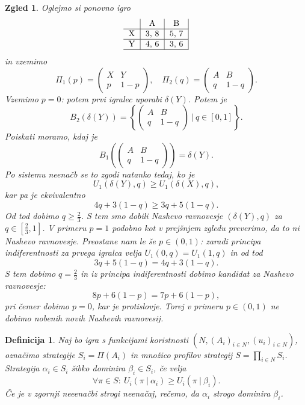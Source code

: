 \documentclass[10pt, a4paper]{article}
\newtheorem{defi}[izr]{Definicija}
\newenvironment{noticeB}{%
  \tcolorbox[%
  notitle,
  empty,
  enhanced,  %
  breakable,
  coltext=black,
  colback=white, 
  fontupper=\rmfamily,
  noparskip,
  sharp corners,
  boxrule=-1pt,  %
  frame hidden,
  left=7pt,  %
  right=7pt,
  top=5pt,
  bottom=5pt,
  before skip=2.5ex plus 2pt,
  after skip=2.5ex plus 2pt,
  borderline west = {1.5pt}{-0.1pt}{blue!30!black}, %
  overlay unbroken and last={%
    \draw[color=black, line width=1.25pt]
    ($(frame.south west)+(1.pt, -0.1pt)$) -- ++(2em, 0);
  }
  ]}
{\endtcolorbox}
\newenvironment{definicija}{\begin{noticeB}\begin{defi}}{%
    \end{defi}\end{noticeB}}
\newtheorem{zgled}[izr]{Zgled}
\begin{document}
\begin{zgled}
  Oglejmo si ponovno igro 
  $$
  \begin{tabular}{c|c|c|}
    & \textrm{A} & \textrm{B}\\
    \hline
    \textrm{X} & 3, 8 & 5, 7\\
    \hline
    \textrm{Y} & 4, 6 & 3, 6\\
    \hline
  \end{tabular}
  $$
  in vzemimo 
  $$\Pi_1 (p) = \begin{pmatrix}
    X & Y\\
    p & 1 - p
  \end{pmatrix}, \quad \Pi_2 (q) = \begin{pmatrix}
    A & B\\
    q & 1 - q
  \end{pmatrix}.$$
    Vzemimo $p = 0$: potem prvi igralec uporabi $\delta(Y)$.
  Potem je $$B_2 (\delta(Y)) = \left\lbrace \begin{pmatrix}
    A & B\\
    q & 1 - q
  \end{pmatrix}\ \Big|\ q \in [0, 1] \right\rbrace.$$
  Poiskati moramo, kdaj je $$B_1 \left(\begin{pmatrix}
    A & B\\
    q & 1 - q
  \end{pmatrix}\right) = \delta(Y).$$
  Po sistemu neenačb se to zgodi natanko tedaj, ko je 
  $$U_1 (\delta(Y), q) \geq U_1(\delta(X), q),$$
  kar pa je ekvivalentno 
  $$4q + 3 (1 - q) \geq 3q + 5 (1 - q).$$
  Od tod dobimo $q \geq \frac{2}{3}$.
  S tem smo dobili Nashevo ravnovesje $(\delta(Y), q)$ za $q \in \left[\frac{2}{3}, 1\right]$.
  V primeru $p = 1$ podobno kot v prejšnjem zgledu preverimo, da to ni Nashevo ravnovesje.
  Preostane nam le še $p \in (0, 1)$: zaradi principa indiferentnosti za prvega igralca velja
  $U_1 (0, q) = U_1(1, q)$ in od tod 
  $$3q + 5(1 - q) = 4 q + 3 (1 - q).$$
  S tem dobimo $q = \frac{2}{3}$ in iz principa indiferentnosti dobimo kandidat za Nashevo ravnovesje: 
  $$8p + 6(1 - p) = 7p + 6(1 - p),$$
  pri čemer dobimo $p = 0$, kar je protislovje. Torej v primeru 
  $p \in (0, 1)$ ne dobimo nobenih novih Nashevih ravnovesij. 
\end{zgled}

\begin{definicija}
  Naj bo igra s funkcijami koristnosti $(N, (A_i)_{i \in N}, (u_i)_{i \in N})$, označimo strategije $S_i = \Pi(A_i)$ in množico profilov strategij
   $S = \prod_{i \in N} S_i$.
   Strategija $\alpha_i \in S_i$ šibko dominira $\beta_i \in S_i$, če velja 
   $$\forall \pi \in S:\ U_i (\pi\ |\ \alpha_i) \geq U_i (\pi\ |\ \beta_i).$$
   Če je v zgornji neeenačbi strogi neenačaj, rečemo, da $\alpha_i$ 
   strogo dominira $\beta_i$. 
\end{definicija}
\end{document}
